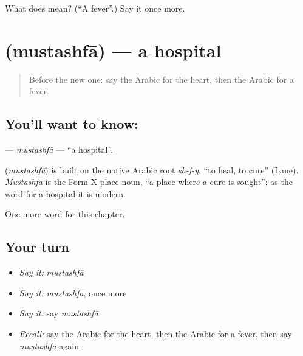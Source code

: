 \begin{tcolorbox}[breakable,colback=teal!4,colframe=teal!35!black,title={Before you move on}]
What does  mean? (\textquotedblleft{}A fever\textquotedblright{}.) Say it once more.
\end{tcolorbox}
\section[\texorpdfstring{\ar{مستشفى} (mustashfā)}{مستشفى (mustashfā)}]{ (mustashfā) — a hospital}

\label{lesson:AR-C53-mustashfa}



\begin{quote}
Before the new one: say the Arabic for the heart, then the Arabic for a fever.
\end{quote}

\subsection*{You'll want to know: }
\textbf{} — \emph{mustashfā} — \textquotedblleft{}a hospital\textquotedblright{}.

\begin{cousinweb}
\textbf{} (\emph{mustashfā}) is built on the native Arabic root \emph{sh-f-y}, \textquotedblleft{}to heal, to cure\textquotedblright{} (Lane). \emph{Mustashfā} is the Form X place noun, \textquotedblleft{}a place where a cure is sought\textquotedblright{}; as the word for a hospital it is modern.
\end{cousinweb}

\begin{grammarlens}[title={What you've built}]
One more word for this chapter.
\end{grammarlens}

\subsection*{Your turn}
\begin{itemize}
\raggedright
  \item \emph{Say it:} \emph{mustashfā}
  \item \emph{Say it:} \emph{mustashfā}, once more
  \item \emph{Say it:} say \emph{mustashfā}
  \item \emph{Recall:} say the Arabic for the heart, then the Arabic for a fever, then say \emph{mustashfā} again
\end{itemize}

